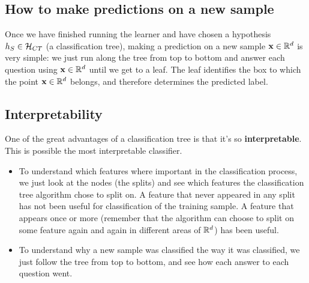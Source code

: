  


 \subsection{How to make predictions on a new sample}

 Once we have finished running the learner and have chosen a hypothesis
 $h_S\in\mathcal{H}_{CT}$ (a classification tree), making a prediction on a new sample
 $\mathbf{x}\in\mathbb{R}^d$ 
 is very simple: we just run along the tree from top to bottom and answer each
 question using $\mathbf{x}\in\mathbb{R}^d$ until we get to a leaf. The leaf identifies
 the box to which the point  $\mathbf{x}\in\mathbb{R}^d$  belongs, and therefore
 determines the predicted label.

 \subsection{Interpretability}

 One of the great advantages of a classification tree is that it's so {\bf
 interpretable}. This is possible the most interpretable classifier.
 \begin{itemize}
   \item To understand which features where important in the classification
     process, we just look at the nodes (the splits) and see which features the
     classification tree 
     algorithm chose to split on. A feature that never appeared in any split has not been
     useful for classification of the training sample. A feature that appears
     once or more (remember that the algorithm can choose to split on some
     feature again and again in different areas of $\mathbb{R}^d$) has been useful.  

   \item To
 understand why a new sample was classified the way it was classified, we just
 follow the tree from top to bottom, and see how each answer to each question
 went. 

 \end{itemize}
  
